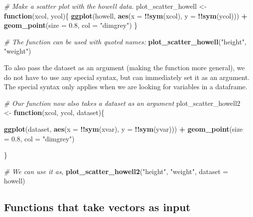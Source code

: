 \documentclass[]{book}
\newenvironment{Shaded}{\begin{snugshade}}{\end{snugshade}}
\newcommand{\CommentTok}[1]{\textcolor[rgb]{0.56,0.35,0.01}{\textit{#1}}}
\newcommand{\ControlFlowTok}[1]{\textcolor[rgb]{0.13,0.29,0.53}{\textbf{#1}}}
\newcommand{\DataTypeTok}[1]{\textcolor[rgb]{0.13,0.29,0.53}{#1}}
\newcommand{\FloatTok}[1]{\textcolor[rgb]{0.00,0.00,0.81}{#1}}
\newcommand{\KeywordTok}[1]{\textcolor[rgb]{0.13,0.29,0.53}{\textbf{#1}}}
\newcommand{\NormalTok}[1]{#1}
\newcommand{\OperatorTok}[1]{\textcolor[rgb]{0.81,0.36,0.00}{\textbf{#1}}}
\newcommand{\StringTok}[1]{\textcolor[rgb]{0.31,0.60,0.02}{#1}}
\begin{document}
\begin{Shaded}
\begin{Highlighting}[]
\CommentTok{# Make a scatter plot with the howell data.}
\NormalTok{plot_scatter_howell <-}\StringTok{ }\ControlFlowTok{function}\NormalTok{(xcol, ycol)\{}
    \KeywordTok{ggplot}\NormalTok{(howell, }\KeywordTok{aes}\NormalTok{(}\DataTypeTok{x =} \OperatorTok{!!}\KeywordTok{sym}\NormalTok{(xcol), }\DataTypeTok{y =} \OperatorTok{!!}\KeywordTok{sym}\NormalTok{(ycol))) }\OperatorTok{+}
\StringTok{    }\KeywordTok{geom_point}\NormalTok{(}\DataTypeTok{size =} \FloatTok{0.8}\NormalTok{, }\DataTypeTok{col =} \StringTok{"dimgrey"}\NormalTok{)}
\NormalTok{\}}

\CommentTok{# The function can be used with quoted names:}
\KeywordTok{plot_scatter_howell}\NormalTok{(}\StringTok{"height"}\NormalTok{, }\StringTok{"weight"}\NormalTok{)}
\end{Highlighting}
\end{Shaded}

To also pass the dataset as an argument (making the function more general), we do not have to use any special syntax, but can immediately set it as an argument. The special syntax only applies when we are looking for variables in a dataframe.

\begin{Shaded}
\begin{Highlighting}[]
\CommentTok{# Our function now also takes a dataset as an argument}
\NormalTok{plot_scatter_howell2 <-}\StringTok{ }\ControlFlowTok{function}\NormalTok{(xcol, ycol, dataset)\{}
  
  \KeywordTok{ggplot}\NormalTok{(dataset, }\KeywordTok{aes}\NormalTok{(}\DataTypeTok{x =} \OperatorTok{!!}\KeywordTok{sym}\NormalTok{(xvar), }\DataTypeTok{y =} \OperatorTok{!!}\KeywordTok{sym}\NormalTok{(yvar))) }\OperatorTok{+}
\StringTok{  }\KeywordTok{geom_point}\NormalTok{(}\DataTypeTok{size =} \FloatTok{0.8}\NormalTok{, }\DataTypeTok{col =} \StringTok{"dimgrey"}\NormalTok{)}
  
\NormalTok{\}}

\CommentTok{# We can use it as,}
\KeywordTok{plot_scatter_howell2}\NormalTok{(}\StringTok{"height"}\NormalTok{, }\StringTok{"weight"}\NormalTok{, }\DataTypeTok{dataset =}\NormalTok{ howell)}
\end{Highlighting}
\end{Shaded}

\hypertarget{functions-that-take-vectors-as-input}{%
\subsection{Functions that take vectors as input}\label{functions-that-take-vectors-as-input}}
\end{document}
